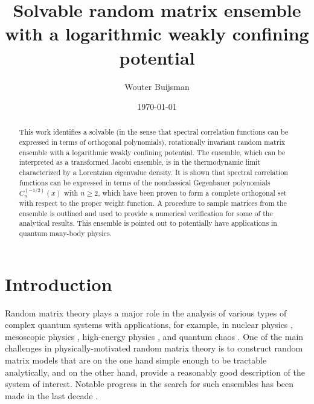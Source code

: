 \documentclass[aps, notitlepage, floatfix, pre, twocolumn]{revtex4-2}
\begin{document}
\title{Solvable random matrix ensemble with a logarithmic weakly confining potential}

\author{Wouter Buijsman} 



\date{\today}

\begin{abstract}
This work identifies a solvable (in the sense that spectral correlation functions can be expressed in terms of orthogonal polynomials), rotationally invariant random matrix ensemble with a logarithmic weakly confining potential. The ensemble, which can be interpreted as a transformed Jacobi ensemble, is in the thermodynamic limit characterized by a Lorentzian eigenvalue density. It is shown that spectral correlation functions can be expressed in terms of the nonclassical Gegenbauer polynomials $C_n^{(-1/2)}(x)$ with $n \ge 2$, which have been proven to form a complete orthogonal set with respect to the proper weight function. A procedure to sample matrices from the ensemble is outlined and used to provide a numerical verification for some of the analytical results. This ensemble is pointed out to potentially have applications in quantum many-body physics.
\end{abstract}

\maketitle



\section{Introduction}
Random matrix theory plays a major role in the analysis of various types of complex quantum systems \cite{Guhr98, Mehta10} with applications, for example, in nuclear physics \cite{Weidemuller09, Borgonovi16}, mesoscopic physics \cite{Beenakker97, Beenakker15}, high-energy physics \cite{Maldacena16, Cotler18}, and quantum chaos \cite{DAlessio16, Deutsch18}. One of the main challenges in physically-motivated random matrix theory is to construct random matrix models that are on the one hand simple enough to be tractable analytically, and on the other hand, provide a reasonably good description of the system of interest. Notable progress in the search for such ensembles has been made in the last decade \cite{Kravtsov15, vonKeyserlingk18, Nahum18, Chan18}. 
\end{document}
